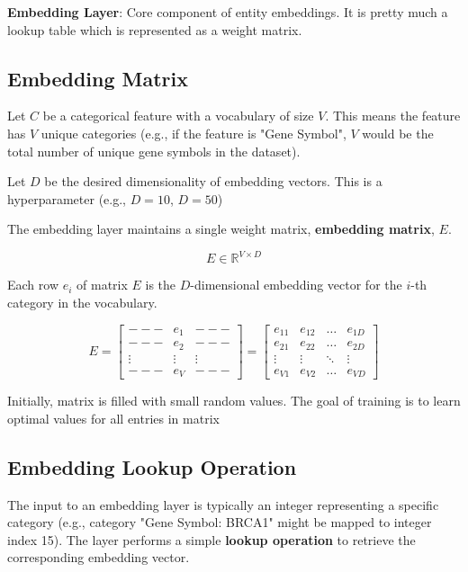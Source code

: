 \documentclass[../main.tex]{subfiles}
\begin{document}
\vspace{0.2cm}

\textbf{Embedding Layer}: Core component of entity embeddings. It is pretty much a lookup table which is represented as a weight matrix.

\subsection{Embedding Matrix}

Let $C$ be a categorical feature with a vocabulary of size $V$. This means the feature has $V$ unique categories (e.g., if the feature is "Gene Symbol", $V$ would be the total number of unique gene symbols in the dataset).

Let $D$ be the desired dimensionality of embedding vectors. This is a hyperparameter (e.g., $D=10$, $D=50$)

The embedding layer maintains a single weight matrix, \textbf{embedding matrix}, $E$.

\begin{equation}
    E \in \mathbb{R}^{V \times D}
\end{equation}

Each row $e_i$ of matrix $E$ is the $D$-dimensional embedding vector for the $i$-th category in the vocabulary.

\[
E =
  \begin{bmatrix}
    --- & e_1 & --- \\
    --- & e_2 & --- \\
    \vdots & \vdots & \vdots \\
    --- & e_V & ---
  \end{bmatrix}
=
  \begin{bmatrix}
    e_{11} & e_{12} & \dots & e_{1D} \\
    e_{21} & e_{22} & \dots & e_{2D} \\
    \vdots & \vdots & \ddots & \vdots \\
    e_{V1} & e_{V2} & \dots & e_{VD}
  \end{bmatrix}
\]

Initially, matrix is filled with small random values. The goal of training is to learn optimal values for all entries in matrix

\subsection{Embedding Lookup Operation}

The input to an embedding layer is typically an integer representing a specific category (e.g., category "Gene Symbol: BRCA1" might be mapped to integer index 15). The layer performs a simple \textbf{lookup operation} to retrieve the corresponding embedding vector.
\end{document}
